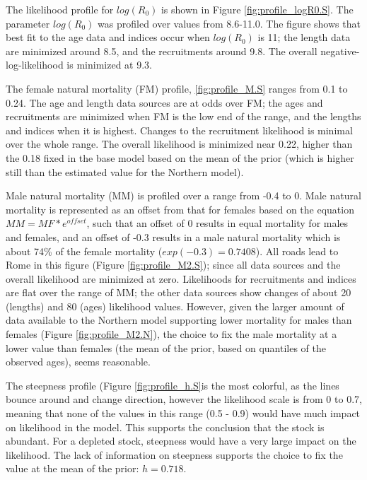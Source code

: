 \documentclass[12pt,]{article}
\begin{document}
The likelihood profile for \textbf{\(log(R_0)\)} is shown in Figure
\ref{fig:profile_logR0.S}. The parameter \(log(R_0)\) was profiled over
values from 8.6-11.0. The figure shows that best fit to the age data and
indices occur when \(log(R_0)\) is 11; the length data are minimized
around 8.5, and the recruitments around 9.8. The overall
negative-log-likelihood is minimized at 9.3.

The female natural mortality (FM) profile, \ref{fig:profile_M.S} ranges
from 0.1 to 0.24. The age and length data sources are at odds over FM;
the ages and recruitments are minimized when FM is the low end of the
range, and the lengths and indices when it is highest. Changes to the
recruitment likelihood is minimal over the whole range. The overall
likelihood is minimized near 0.22, higher than the 0.18 fixed in the
base model based on the mean of the prior (which is higher still than
the estimated value for the Northern model).

Male natural mortality (MM) is profiled over a range from -0.4 to 0.
Male natural mortality is represented as an offset from that for females
based on the equation \({MM} = {MF}*e^{offset}\), such that an offset of
0 results in equal mortality for males and females, and an offset of
-0.3 results in a male natural mortality which is about 74\% of the
female mortality (\(exp(-0.3) = 0.7408\)). All roads lead to Rome in
this figure (Figure \ref{fig:profile_M2.S}); since all data sources and
the overall likelihood are minimized at zero. Likelihoods for
recruitments and indices are flat over the range of MM; the other data
sources show changes of about 20 (lengths) and 80 (ages) likelihood
values. However, given the larger amount of data available to the
Northern model supporting lower mortality for males than females (Figure
\ref{fig:profile_M2.N}), the choice to fix the male mortality at a lower
value than females (the mean of the prior, based on quantiles of the
observed ages), seems reasonable.

The steepness profile (Figure \ref{fig:profile_h.S}is the most colorful,
as the lines bounce around and change direction, however the likelihood
scale is from 0 to 0.7, meaning that none of the values in this range
(0.5 - 0.9) would have much impact on likelihood in the model. This
supports the conclusion that the stock is abundant. For a depleted
stock, steepness would have a very large impact on the likelihood. The
lack of information on steepness supports the choice to fix the value at
the mean of the prior: \(h=0.718\).
\end{document}

